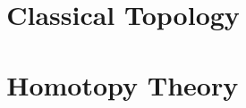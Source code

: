


% 
% 
% 


% 

\part{~~Classical Topology}



\part{~~Homotopy Theory}




% 


% 


% 



% 
% 



